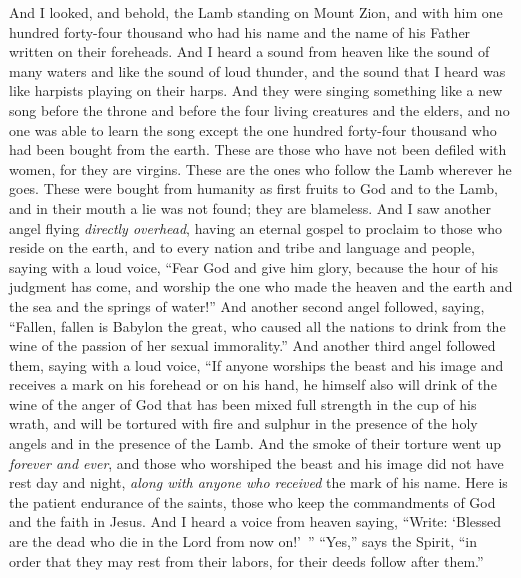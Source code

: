 \begin{biblechapter} %
 And I looked, and behold, the Lamb standing on Mount Zion, and with him one hundred forty-four thousand who had his name and the name of his Father written on their foreheads.
\verse And I heard a sound from heaven like the sound of many waters and like the sound of loud thunder, and the sound that I heard was like harpists playing on their harps.
\verse And they were singing something like a new song before the throne and before the four living creatures and the elders, and no one was able to learn the song except the one hundred forty-four thousand who had been bought from the earth.
\verse These are those who have not been defiled with women, for they are virgins. These are the ones who follow the Lamb wherever he goes. These were bought from humanity as first fruits to God and to the Lamb,
\verse and in their mouth a lie was not found; they are blameless.
 And I saw another angel flying \textit{directly overhead}, having an eternal gospel to proclaim to those who reside on the earth, and to every nation and tribe and language and people,
\verse saying with a loud voice, “Fear God and give him glory, because the hour of his judgment has come, and worship the one who made the heaven and the earth and the sea and the springs of water!”
\verse And another second angel followed, saying, “Fallen, fallen is Babylon the great, who caused all the nations to drink from the wine of the passion of her sexual immorality.”
\verse And another third angel followed them, saying with a loud voice, “If anyone worships the beast and his image and receives a mark on his forehead or on his hand,
\verse he himself also will drink of the wine of the anger of God that has been mixed full strength in the cup of his wrath, and will be tortured with fire and sulphur in the presence of the holy angels and in the presence of the Lamb.
\verse And the smoke of their torture went up \textit{forever and ever}, and those who worshiped the beast and his image did not have rest day and night, \textit{along with anyone who received} the mark of his name.
\verse Here is the patient endurance of the saints, those who keep the commandments of God and the faith in Jesus.
\verse And I heard a voice from heaven saying, “Write: ‘Blessed are the dead who die in the Lord from now on!’ ” “Yes,” says the Spirit, “in order that they may rest from their labors, for their deeds follow after them.”

\end{biblechapter}
